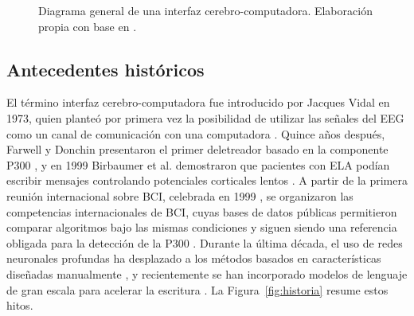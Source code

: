\begin{figure}[htbp]
\centering
{}
\caption{Diagrama general de una interfaz cerebro-computadora. Elaboración propia con base en
\cite{wolpaw2002,wolpaw2012}.}
\label{fig:bci}
\end{figure}

\subsection{Antecedentes históricos}

El término interfaz cerebro-computadora fue introducido por Jacques Vidal en 1973, quien planteó
por primera vez la posibilidad de utilizar las señales del EEG como un canal de comunicación con
una computadora \cite{vidal1973}. Quince años después, Farwell y Donchin presentaron el primer
deletreador basado en la componente P300 \cite{farwell1988}, y en 1999 Birbaumer et al.
demostraron que pacientes con ELA podían escribir mensajes controlando potenciales corticales
lentos \cite{birbaumer1999}. A partir de la primera reunión internacional sobre BCI, celebrada en
1999 \cite{wolpaw2000}, se organizaron las competencias internacionales de BCI, cuyas bases de
datos públicas permitieron comparar algoritmos bajo las mismas condiciones y siguen siendo una
referencia obligada para la detección de la P300 \cite{blankertz2004,blankertz2006}. Durante la
última década, el uso de redes neuronales profundas ha desplazado a los métodos basados en
características diseñadas manualmente \cite{craik2019,roy2019}, y recientemente se han incorporado
modelos de lenguaje de gran escala para acelerar la escritura \cite{hong2026}. La
Figura~\ref{fig:historia} resume estos hitos.

